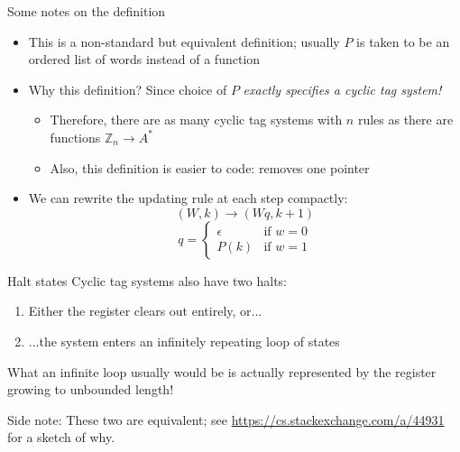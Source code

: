 \documentclass[aspectratio=169]{beamer}
\begin{document}
\begin{frame}{Some notes on the definition}
    \begin{itemize}
        \item This is a non-standard but equivalent definition; usually $P$ is taken to be an ordered list of words instead of a function \pause
        \item Why this definition? Since choice of $P$ \textit{exactly specifies a cyclic tag system!}\pause
        \begin{itemize}
            \item Therefore, there are as many cyclic tag systems with $n$ rules as there are functions $\mathbb{Z}_n \rightarrow A^*$ \pause
            \item Also, this definition is easier to code: removes one pointer
        \end{itemize} \pause
        \item We can rewrite the updating rule at each step compactly: $$(W, k) \rightarrow (Wq, k+1)$$
        $$q = \begin{cases}
            \epsilon &\text{if } w = 0 \\ P(k) &\text{if } w = 1
        \end{cases}$$
    \end{itemize}
\end{frame}

\begin{frame}{Halt states}
    Cyclic tag systems also have two halts: \pause
    \begin{enumerate}
        \item Either the register clears out entirely, or... \pause
        \item ...the system enters an infinitely repeating loop of states
    \end{enumerate} \pause
    What an infinite loop usually would be is actually represented by the register growing to unbounded length! \pause
    \vspace{4pt}
    
    Side note: These two are equivalent; see \url{https://cs.stackexchange.com/a/44931} for a sketch of why.
\end{frame}
\end{document}
